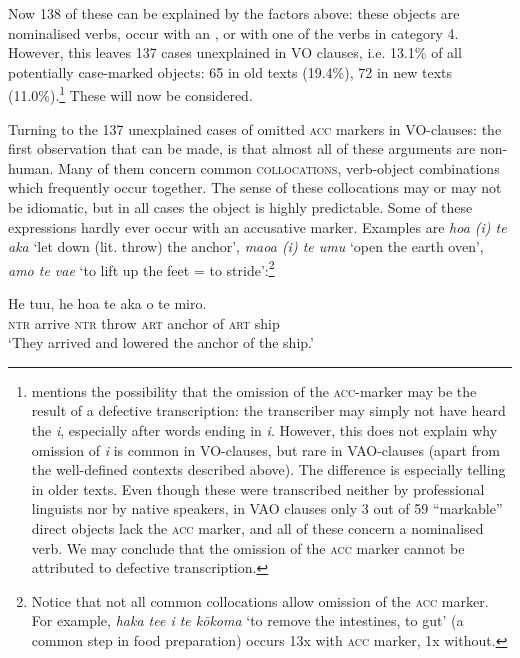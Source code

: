 Now 138 of these can be explained by the factors above: these objects are nominalised verbs, occur with an , or with one of the verbs in category 4. However, this leaves 137 cases unexplained in VO clauses, i.e. 13.1\% of all potentially case-marked objects: 65 in old texts (19.4\%), 72 in new texts (11.0\%).\footnote{\label{fn:408}\citet[50–51]{WeberN2003} mentions the possibility that the omission of the \textsc{acc}{}-marker may be the result of a defective transcription: the transcriber may simply not have heard the  \textit{i}, especially after words ending in \textit{i}. However, this does not explain why omission of \textit{i} is common in VO-clauses, but rare in VAO-clauses (apart from the well-defined contexts described above). The difference is especially telling in older texts. Even though these were transcribed neither by professional linguists nor by native speakers, in VAO clauses only 3 out of 59 “markable” direct objects lack the \textsc{acc} marker, and all of these concern a nominalised verb. We may conclude that the omission of the \textsc{acc} marker cannot be attributed to defective transcription.} These will now be considered.

Turning to the 137 unexplained cases of omitted \textsc{acc} markers in VO-clauses: the first observation that can be made, is that almost all of these arguments are non-human. Many of them concern common \textsc{collocations}, verb-object combinations which frequently occur together. The sense of these collocations may or may not be idiomatic, but in all cases the object is highly predictable. Some of these expressions hardly ever occur with an accusative marker. Examples are \textit{hoa (i) te {\ꞌ}aka} ‘let down (lit. throw) the anchor’, \textit{\mbox{ma{\ꞌ}oa} (i) te {\ꞌ}umu} ‘open the earth oven’, \textit{{\ꞌ}amo te va{\ꞌ}e} ‘to lift up the feet = to stride’:\footnote{\label{fn:409}Notice that not all common collocations allow omission of the \textsc{acc} marker. For example, \textit{haka te{\ꞌ}e i te kōkoma} ‘to remove the intestines, to gut’ (a common step in food preparation) occurs 13x with \textsc{acc} marker, 1x without.}

\ea\label{ex:8.40}
\gll He tu{\ꞌ}u, he hoa te {\ꞌ}aka o te miro.\\
\textsc{ntr} arrive \textsc{ntr} throw \textsc{art} anchor of \textsc{art} ship\\

\glt
‘They arrived and lowered the anchor of the ship.’ \textstyleExampleref{[Egt-02.099]}
\z

